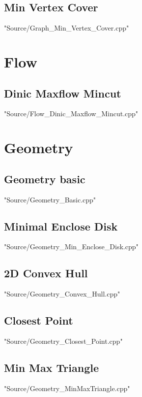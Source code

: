 \documentclass [12pt,twocolumn,oneside]{article}
\begin{document}
\subsection{Min Vertex Cover}
 {"Source/Graph_Min_Vertex_Cover.cpp"}




\newpage
\section{Flow}
\subsection{Dinic Maxflow Mincut}
 {"Source/Flow_Dinic_Maxflow_Mincut.cpp"}




\newpage
\section{Geometry}
\subsection{Geometry basic}
 {"Source/Geometry_Basic.cpp"}

\subsection{Minimal Enclose Disk}
 {"Source/Geometry_Min_Enclose_Disk.cpp"}

\subsection{2D Convex Hull}
 {"Source/Geometry_Convex_Hull.cpp"}

\subsection{Closest Point}
 {"Source/Geometry_Closest_Point.cpp"}

\subsection{Min Max Triangle}
 {"Source/Geometry_MinMaxTriangle.cpp"}
\end{document}
